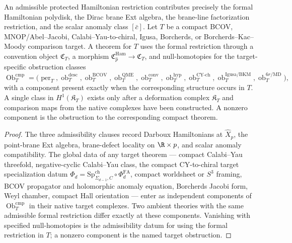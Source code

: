 \begin{lem}\label{lem:formal-restriction-compact-comparison}
  An admissible protected Hamiltonian restriction contributes precisely
  the formal Hamiltonian polydisk, the Dirac brane Ext algebra, the brane-line
  factorization restriction, and the scalar anomaly class \( [\bar c] \).
  Let \(T\) be a compact BCOV, MNOP/Abel--Jacobi, Calabi--Yau-to-chiral,
  Igusa, Borcherds, or Borcherds--Kac--Moody comparison target.  A
  theorem for \(T\) uses the formal restriction through a convention
  object \(\mathfrak C_T\), a morphism
  \(\mathfrak C_{\widehat p}^{\mathrm{Ham}}\to \mathfrak C_T\), and
  null-homotopies for the target-specific obstruction classes
  \[
    \operatorname{Ob}^{\mathrm{cmp}}_T
    =
    \bigl(
      \operatorname{per}_T,
      \operatorname{ob}^{\mathrm{desc}}_T,
      \operatorname{ob}^{\mathrm{BCOV}}_T,
      \operatorname{ob}^{\mathrm{QME}}_T,
      \operatorname{ob}^{\mathrm{conv}}_T,
      \operatorname{ob}^{\mathrm{hyp}}_T,
      \operatorname{ob}^{\mathrm{CY\mbox{-}ch}}_T,
      \operatorname{ob}^{\mathrm{Igusa/BKM}}_T,
      \operatorname{ob}^{6r/\mathrm{MD}}_T
    \bigr),
  \]
  with a component present exactly when the corresponding structure
  occurs in \(T\).  A single class in \(H^1(\mathfrak K_T)\) exists
  only after a deformation complex \(\mathfrak K_T\) and comparison maps
  from the native complexes have been constructed.  A nonzero component
  is the obstruction to the corresponding compact theorem.
\end{lem}

\begin{proof}
  The three admissibility clauses record Darboux Hamiltonians at
  \(\widehat X_p\), the point-brane Ext algebra, brane-defect locality on
  \(\R\times p\), and scalar anomaly compatibility.  The global data of
  any target theorem --- compact Calabi--Yau threefold, negative-cyclic
  Calabi--Yau class, the compact CY-to-chiral target specialization datum
  \(\Phi_d=\mathrm{Sp}^{\mathrm{ch}}_{\Sigma_{d-1},C}\circ
  \Phi^{\mathrm{FA}}_d\),
  compact worldsheet or \(S^3\) framing, BCOV propagator and holomorphic
  anomaly equation, Borcherds Jacobi form, Weyl chamber, compact
  Hall orientation --- enter as independent components of
  \(\operatorname{Ob}^{\mathrm{cmp}}_T\) in their native target
  complexes.  Two ambient theories with the same admissible
  formal restriction differ exactly at these components.  Vanishing
  with specified null-homotopies is the admissibility datum for using the
  formal restriction in \(T\); a nonzero component is the named target
  obstruction.
\end{proof}

